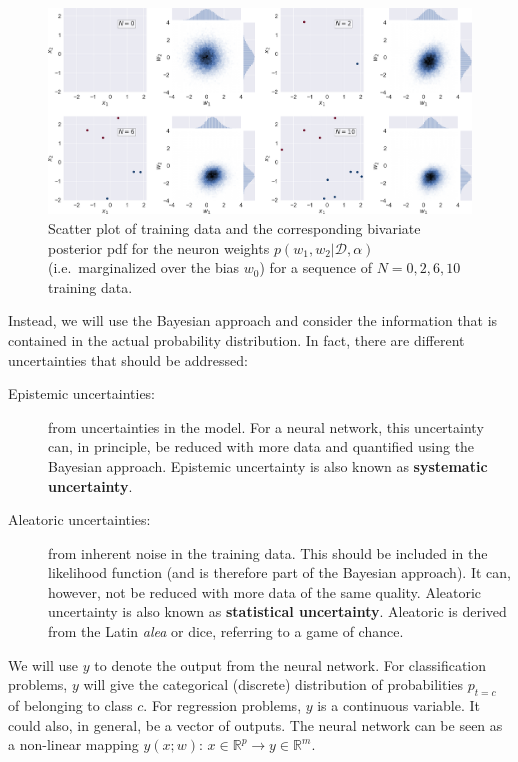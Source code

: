 \documentclass[%
oneside,                 %
final,                   %
10pt]{article}
\newenvironment{notice_mdfboxadmon}[1][]{
\begin{notice_mdfboxmdframed}[frametitle=#1]
}
{
\end{notice_mdfboxmdframed}
}
\begin{document}
\begin{figure}[!ht]  %
  \centerline{\includegraphics[width=0.95\linewidth]{fig/scatter_joint_bnn_plot.png}}
  \caption{
  Scatter plot of training data and the corresponding bivariate posterior pdf for the neuron weights $p(w_1, w_2 | \mathcal{D}, \alpha)$ (i.e.~marginalized over the bias $w_0$) for a sequence of $N=0,2,6,10$ training data.
  }
\end{figure}


Instead, we will use the Bayesian approach and consider the information that is contained in the actual probability distribution. In fact, there are different uncertainties that should be addressed:

\begin{description}
\item[Epistemic uncertainties:] 
  from uncertainties in the model. For a neural network, this uncertainty can, in principle, be reduced with more data and quantified using the Bayesian approach. Epistemic uncertainty is also known as \textbf{systematic uncertainty}.

\item[Aleatoric uncertainties:] 
  from inherent noise in the training data. This should be included in the likelihood function (and is therefore part of the Bayesian approach). It can, however, not be reduced with more data of the same quality. Aleatoric uncertainty is also known as \textbf{statistical uncertainty}. Aleatoric is derived from the Latin \emph{alea} or dice, referring to a game of chance.
\end{description}

\noindent

\begin{notice_mdfboxadmon}[Notice]
We will use $y$ to denote the output from the neural network. For classification problems, $y$ will give the categorical (discrete) distribution of probabilities $p_{t=c}$ of belonging to class $c$. For regression problems, $y$ is a continuous variable. It could also, in general, be a vector of outputs. The neural network can be seen as a non-linear mapping $y(x; w)$: $x \in \mathbb{R}^p \to y \in \mathbb{R}^m$.
\end{notice_mdfboxadmon} %
\end{document}
